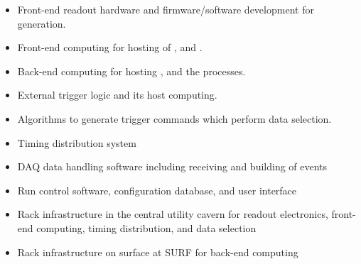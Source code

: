 \begin{itemize}
\item Front-end readout hardware and firmware/software development for  generation.
\item Front-end computing for hosting of ,  and .
\item Back-end computing for hosting ,  and the  processes.
\item External trigger logic and its host computing.
\item Algorithms to generate trigger commands which perform data selection.
\item Timing distribution system
\item DAQ data handling software including receiving and building of
  events
\item Run control software, configuration database, and user interface
\item Rack infrastructure in the central utility cavern for readout
  electronics, front-end computing, timing distribution, and data
  selection
\item Rack infrastructure on surface at SURF for back-end computing
\end{itemize}



